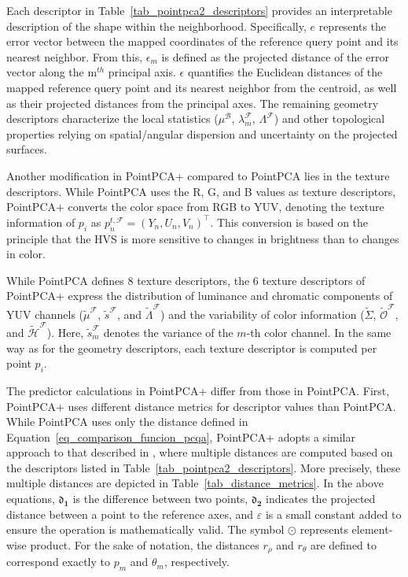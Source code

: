 \documentclass[final,3p,times,twocolumn]{elsarticle}
\begin{document}
Each descriptor in Table~\ref{tab_pointpca2_descriptors} provides an interpretable description of the shape within the neighborhood. Specifically, $e$ represents the error vector between the mapped coordinates of the reference query point and its nearest neighbor. From this, $\epsilon_m$ is defined as the projected distance of the error vector along the m$^{th}$ principal axis. $\epsilon$ quantifies the Euclidean distances of the mapped reference query point and its nearest neighbor from the centroid, as well as their projected distances from the principal axes. The remaining geometry descriptors characterize the local statistics ($\mu^\mathcal{B}$, $\lambda_m^\mathcal{F}$, $\Lambda^\mathcal{F}$) and other topological properties relying on spatial/angular dispersion and uncertainty on the projected surfaces.

Another modification in PointPCA+ compared to PointPCA lies in the texture descriptors. While PointPCA uses the R, G, and B values as texture descriptors, PointPCA+ converts the color space from \gls{RGB} to \gls{YUV}, denoting the texture information of $p_i$ as $p_n^{t,\mathcal{F}} = \left( Y_n, U_n, V_n \right)^\top$. This conversion is based on the principle that the \gls{HVS} is more sensitive to changes in brightness than to changes in color. 

While PointPCA defines 8 texture descriptors, the 6 texture descriptors of PointPCA+ express the distribution of luminance and chromatic components of \gls{YUV} channels ($\tilde{\mu}^\mathcal{F}$, $\tilde{s}^\mathcal{F}$, and $\tilde{\Lambda}^\mathcal{F}$) and the variability of color information ($\tilde{\Sigma}$, $\tilde{\mathcal{O}}^\mathcal{F}$, and $\tilde{\mathcal{H}}^\mathcal{F}$). Here, $\tilde{s}_m^\mathcal{F}$ denotes the variance of the $m$-th color channel. In the same way as for the geometry descriptors, each texture descriptor is computed per point $p_i$.






The predictor calculations in PointPCA+ differ from those in PointPCA. First, PointPCA+ uses different distance metrics for descriptor values than PointPCA. While PointPCA uses only the distance defined in Equation~\ref{eq_comparison_funcion_pcqa}, PointPCA+ adopts a similar approach to that described in \cite{diniz2020multi}, where multiple distances are computed based on the descriptors listed in Table~\ref{tab_pointpca2_descriptors}. More precisely, these multiple distances are depicted in Table~\ref{tab_distance_metrics}.
In the above equations, $\mathbf{\mathfrak{d}_1}$ is the difference between two points, $\mathbf{\mathfrak{d}_2}$ indicates the projected distance between a point to the reference axes, and $\varepsilon$ is a small constant added to ensure the operation is mathematically valid. The symbol $\odot$ represents element-wise product.  For the sake of notation, the distances \( r_{\rho} \) and \( r_{\theta} \) are defined to correspond exactly to \( p_{m} \) and \( \theta_{m} \), respectively.
\end{document}
